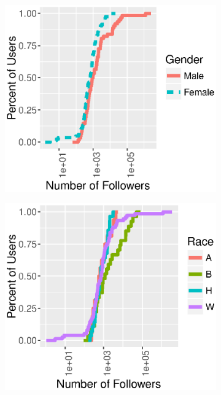 \begin{figure}[t]
  \centering
  \begin{subfigure}[b]{.21\textwidth}
    \centering
    \includegraphics[width=\linewidth]{fig/census/followers_cdf_gender.eps}
    \caption{}
    \label{fig:followers_cdf_gender}
  \end{subfigure}
  \begin{subfigure}[b]{.21\textwidth}
    \centering
    \includegraphics[width=\linewidth]{fig/census/followers_cdf_race.eps}
    \caption{}
    \label{fig:followers_cdf_race}
  \end{subfigure}


\end{figure}

